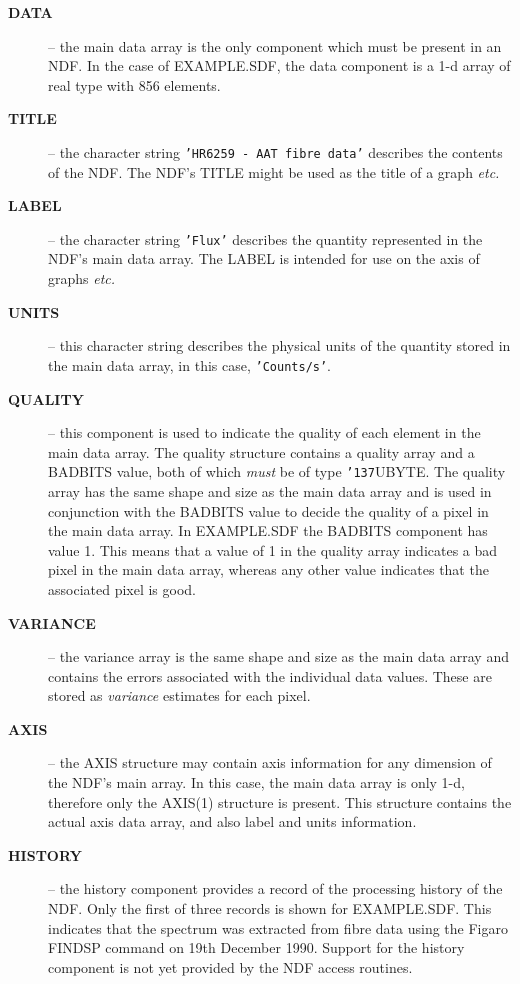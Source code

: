 \documentclass[twoside,11pt]{article}
\renewcommand{\_}{{\tt\char'137}}
\begin{document}
\begin{description}

\item[{\bf DATA}] -- the main data array is the only 
component which must be present in an NDF. 
In the case of EXAMPLE.SDF, the data component is a 1-d 
array of real type with 856 elements.

\item[{\bf TITLE}] -- the  character string {\tt'HR6259 - AAT fibre 
data'} describes the contents of the NDF. The NDF's TITLE
might be used as the title of a graph {\it etc.}

\item[{\bf LABEL}] -- the character string {\tt'Flux'} describes the
quantity represented in the NDF's main data array. The LABEL is
intended for use on the axis of graphs {\it etc.}

\item[{\bf UNITS}] -- this character string
describes the physical units of the quantity stored in the main data 
array, in this case, {\tt'Counts/s'}.

\item[{\bf QUALITY}] -- this component is used to indicate
the quality of each element in the main data array.
The quality structure contains a 
quality array and a BADBITS value, both of which {\sl must\/} be of 
type \_UBYTE.
The quality array has the same shape and size as
the main data array and is used in conjunction with the BADBITS value 
to decide the quality of a pixel in the main data array.
In EXAMPLE.SDF the BADBITS component has value 1.
This means that a value of 1 in the quality array indicates a bad pixel
in the main data array, whereas any other value indicates that 
the associated pixel is good.

\item[{\bf VARIANCE}] -- the variance array is the same shape and size
as the main data array and contains the errors 
associated with the individual data values. 
These are stored as {\sl variance\/} estimates for each
pixel. 

\item[{\bf AXIS}] -- the AXIS structure may contain axis information
for any dimension of the NDF's main array.
In this case, the main data array is only 1-d, therefore only the
AXIS(1) structure is present.
This structure contains the actual axis data array, and also 
label and units information.

\item[{\bf HISTORY}] -- the history component provides a record of
the processing history of the NDF.
Only the first of three records is shown for EXAMPLE.SDF. This indicates
that the spectrum was extracted from fibre data using the Figaro FINDSP
command on 19th December 1990.
Support for the history component is not yet provided by the NDF access 
routines.



\end{description}
\end{document}
